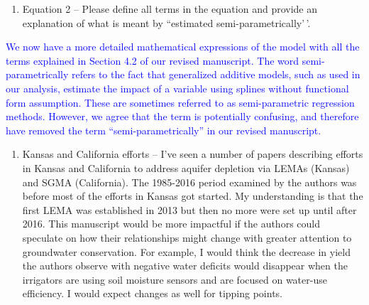 \documentclass[
]{article}
\providecommand{\tightlist}{%
  \setlength{\itemsep}{0pt}\setlength{\parskip}{0pt}}
\begin{document}
\begin{enumerate}
\def\labelenumi{\arabic{enumi}.}
\setcounter{enumi}{3}
\tightlist
\item
  Equation 2 -- Please define all terms in the equation and provide an
  explanation of what is meant by ``estimated semi-parametrically'\,'.
\end{enumerate}

\textcolor{blue}{We now have a more detailed mathematical expressions of the model with all the terms explained in Section 4.2 of our revised manuscript. The word semi-parametrically refers to the fact that generalized additive models, such as used in our analysis, estimate the impact of a variable using splines without functional form assumption. These are sometimes referred to as semi-parametric regression methods. However, we agree that the term is potentially confusing, and therefore have removed the term ``semi-parametrically'' in our revised manuscript.}

\begin{enumerate}
\def\labelenumi{\arabic{enumi}.}
\setcounter{enumi}{4}
\tightlist
\item
  Kansas and California efforts -- I've seen a number of papers
  describing efforts in Kansas and California to address aquifer
  depletion via LEMAs (Kansas) and SGMA (California). The 1985-2016
  period examined by the authors was before most of the efforts in
  Kansas got started. My understanding is that the first LEMA was
  established in 2013 but then no more were set up until after 2016.
  This manuscript would be more impactful if the authors could speculate
  on how their relationships might change with greater attention to
  groundwater conservation. For example, I would think the decrease in
  yield the authors observe with negative water deficits would disappear
  when the irrigators are using soil moisture sensors and are focused on
  water-use efficiency. I would expect changes as well for tipping
  points.
\end{enumerate}
\end{document}

